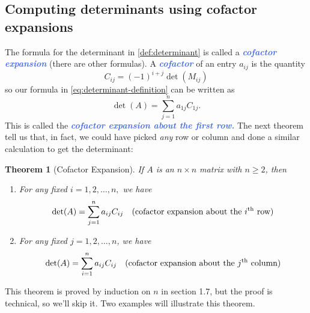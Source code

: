 \documentclass[10pt]{article}
\newcommand{\demph}[1]{\textcolor{RoyalBlue}{\textbf{\slshape #1}}} %
\newtheorem{theorem}{Theorem}
\theoremstyle{definition}
\begin{document}
\subsection{Computing determinants using cofactor expansions}
The formula for the determinant in \cref{def:determinant} is called a
\demph{cofactor expansion} (there are other formulas). A \demph{cofactor} of
an entry $a_{ij}$ is the quantity
\begin{equation*}
  C_{ij} = (-1)^{i+j}\det(M_{ij})
\end{equation*}
so our formula in \cref{eq:determinant-definition} can be written as
\begin{equation*}
  \det(A) = \sum_{j=1}^{n}  a_{1j}C_{1j}. 
\end{equation*}
This is called the \demph{cofactor expansion about the first row.} The next
theorem tell us that, in fact, we could have picked \textit{any} row or column
and done a similar calculation to get the determinant:
\begin{theorem}[Cofactor Expansion]
  \label{thm:cofactor-expansion}
  If $A$ is an $n\times n$ matrix with $n \geq 2$, then
  \begin{enumerate}[label=(\roman*.)]
    \item For any fixed $i=1,2,\ldots,n,$ we have
    \begin{equation*}
      \det(A) = \sum_{j=1}^{n}a_{ij}C_{ij} \quad \text{(cofactor expansion
        about the $i^{\rm th}$ row)}
    \end{equation*}
    \item For any fixed $j=1,2,\ldots,n$, we have
    \begin{equation*}
      \det(A) = \sum_{i=1}^{n}a_{ij}C_{ij} \quad \text{(cofactor expansion
        about the $j^{\rm th}$ column)} 
    \end{equation*}
  \end{enumerate}
\end{theorem}
This theorem is proved by induction on $n$ in section 1.7, but the proof is
technical, so we'll skip it. Two examples will illustrate this theorem.
\end{document}
